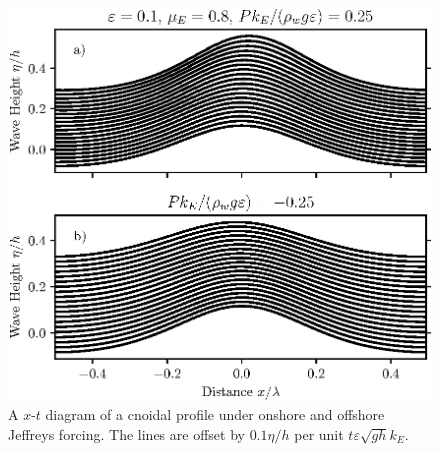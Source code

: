 \documentclass{jfm}
\renewcommand*{\epsilon}{\varepsilon}
\begin{document}
\begin{figure}
  \centering
  \includegraphics{XT-Offset-Cnoidal.eps}
  \caption{
    A $x$-$t$ diagram of a cnoidal profile under onshore and offshore
    Jeffreys forcing.
    The lines are offset by $0.1 \eta/h$ per unit $t \epsilon \sqrt{g h}
    k_E$.
  }
\end{figure}
\end{document}
